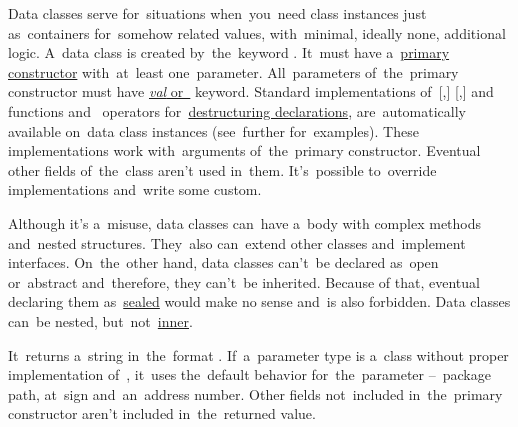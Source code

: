 \label{kotlindataclass}
Data classes serve for~situations when~you~need class instances just as~containers for~somehow related values, with~minimal, ideally none, additional logic.
A~data class is created by~the~keyword .
It~must have a~\hyperref[kotlinprimaryconstructor]{primary constructor} with~at~least one~parameter.
All~parameters of~the~primary constructor must have \hyperref[kotlinvalvar]{\textit{val} or~} keyword.
Standard implementations of~[,] [,]  and~ functions and~ operators for~\hyperref[kotlindestdecl]{destructuring declarations}, are~automatically available on~data class instances (see~further for~examples).
These implementations work with~arguments of~the~primary constructor.
Eventual other fields of~the~class aren't used in~them.
It's~possible to~override implementations and~write some custom.

Although it's a~misuse, data classes can~have a~body with complex methods and~nested structures.
They~also can~extend other classes and~implement interfaces.
On~the~other hand, data classes can't~be declared as~open or~abstract and~therefore, they can't~be inherited.
Because of that, eventual declaring them as~\hyperref[kotlinsealedclass]{sealed} would make no sense and~is also forbidden.
Data classes can~be nested, but~not~\hyperref[kotlininnerclass]{inner}.

\label{kotlindataclasstostring}
It~returns a~string in~the~format .
If~a~parameter type is a~class without proper implementation of~, it~uses the~default behavior for~the~parameter --~package path, at~sign and~an~address number.
Other fields not~included in~the~primary constructor aren't included in~the~returned value.

